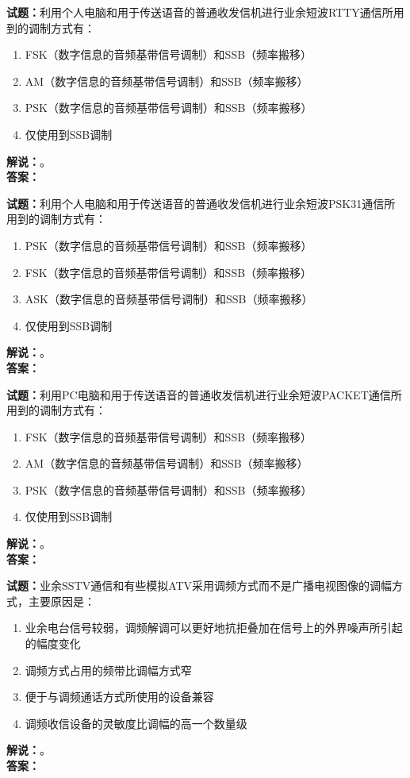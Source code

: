 \documentclass{ctexbook}
\begin{document}
\noindent\textbf{试题：}利用个人电脑和用于传送语音的普通收发信机进行业余短波RTTY通信所用到的调制方式有：
\begin{enumerate}[leftmargin=3em]
  \item FSK（数字信息的音频基带信号调制）和SSB（频率搬移）
  \item AM（数字信息的音频基带信号调制）和SSB（频率搬移）
  \item PSK（数字信息的音频基带信号调制）和SSB（频率搬移）
  \item 仅使用到SSB调制
\end{enumerate}
\noindent\textbf{解说：}\textbf{}。\\\noindent\textbf{答案：}

\vspace{\baselineskip}

\noindent\textbf{试题：}利用个人电脑和用于传送语音的普通收发信机进行业余短波PSK31通信所用到的调制方式有：
\begin{enumerate}[leftmargin=3em]
  \item PSK（数字信息的音频基带信号调制）和SSB（频率搬移）
  \item FSK（数字信息的音频基带信号调制）和SSB（频率搬移）
  \item ASK（数字信息的音频基带信号调制）和SSB（频率搬移）
  \item 仅使用到SSB调制
\end{enumerate}
\noindent\textbf{解说：}\textbf{}。\\\noindent\textbf{答案：}

\vspace{\baselineskip}

\noindent\textbf{试题：}利用PC电脑和用于传送语音的普通收发信机进行业余短波PACKET通信所用到的调制方式有：
\begin{enumerate}[leftmargin=3em]
  \item FSK（数字信息的音频基带信号调制）和SSB（频率搬移）
  \item AM（数字信息的音频基带信号调制）和SSB（频率搬移）
  \item PSK（数字信息的音频基带信号调制）和SSB（频率搬移）
  \item 仅使用到SSB调制
\end{enumerate}
\noindent\textbf{解说：}\textbf{}。\\\noindent\textbf{答案：}

\vspace{\baselineskip}

\noindent\textbf{试题：}业余SSTV通信和有些模拟ATV采用调频方式而不是广播电视图像的调幅方式，主要原因是：
\begin{enumerate}[leftmargin=3em]
  \item 业余电台信号较弱，调频解调可以更好地抗拒叠加在信号上的外界噪声所引起的幅度变化
  \item 调频方式占用的频带比调幅方式窄
  \item 便于与调频通话方式所使用的设备兼容
  \item 调频收信设备的灵敏度比调幅的高一个数量级
\end{enumerate}
\noindent\textbf{解说：}\textbf{}。\\\noindent\textbf{答案：}
\end{document}
